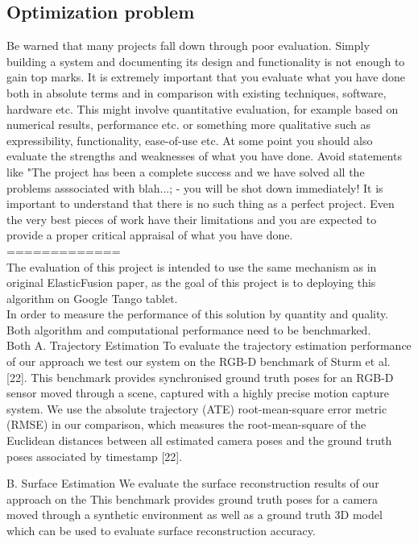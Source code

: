 \documentclass[12pt,twoside]{article}
\begin{document}
\subsection{Optimization problem}

Be warned that many projects fall down through poor evaluation. Simply building a system and documenting its design and functionality is not enough to gain top marks. It is extremely important that you evaluate what you have done both in absolute terms and in comparison with existing techniques, software, hardware etc. This might involve quantitative evaluation, for example based on numerical results, performance etc. or something more qualitative such as expressibility, functionality, ease-of-use etc. At some point you should also evaluate the strengths and weaknesses of what you have done. Avoid statements like "The project has been a complete success and we have solved all the problems asssociated with blah...; - you will be shot down immediately! It is important to understand that there is no such thing as a perfect project. Even the very best pieces of work have their limitations and you are expected to provide a proper critical appraisal of what you have done.\\

=============\\




The evaluation of this project is intended to use the same mechanism as in original ElasticFusion\citep{whelan2016elasticfusion} paper, as the goal of this project is to deploying this algorithm on Google Tango tablet.\\
In order to measure the performance of this solution by quantity and quality. Both algorithm and computational performance need to be benchmarked.\\
Both 
A. Trajectory Estimation
To evaluate the trajectory estimation performance of our approach
we test our system on the RGB-D benchmark of Sturm
et al. [22]. This benchmark provides synchronised ground truth
poses for an RGB-D sensor moved through a scene, captured
with a highly precise motion capture system.  We use the absolute
trajectory (ATE) root-mean-square error metric (RMSE) in
our comparison, which measures the root-mean-square of the
Euclidean distances between all estimated camera poses and
the ground truth poses associated by timestamp [22].
 
 
B. Surface Estimation
We evaluate the surface reconstruction results of our approach
on the 
 This
benchmark provides ground truth poses for a camera moved
through a synthetic environment as well as a ground truth 3D
model which can be used to evaluate surface reconstruction
accuracy. 
\end{document}
